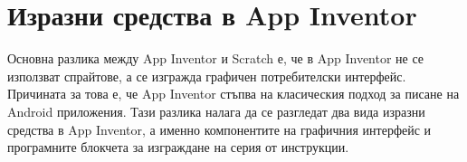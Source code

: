 %
%
%
%
%

\section{Изразни средства в App Inventor}

Основна разлика между App Inventor и Scratch е, че в App Inventor не се използват спрайтове, а се изгражда графичен потребителски интерфейс. Причината за това е, че App Inventor стъпва на класическия подход за писане на Android приложения. Тази разлика налага да се разгледат два вида изразни средства в App Inventor, а именно компонентите на графичния интерфейс и програмните блокчета за изграждане на серия от инструкции.

